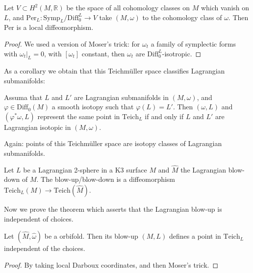 \begin{theorem}
\label{theorem-}
Let $V \subset H^{2}(M,\mathbb{R})$ be the
space of all
cohomology classes on $M$ which vanish on
$L$,
and $\text{Per}_L:
\text{Symp}_L/\text{Diff}^L_0 \to V$
take $(M,\omega)$ to the cohomology class of
$\omega$.
Then Per is a local diffeomorphism.
\end{theorem}

\begin{proof}
We used a version of Moser's trick: for
$\omega_t$ a family
of symplectic forms with $\omega_t|_{L}=0$,
with $[\omega_t]$ constant, then $\omega_t$
are $\text{Diff}_0^L$-isotropic.
\end{proof}

\noindent
As a corollary we obtain that this
Teichmüller space
classifies Lagrangian submanifolds:

\begin{corollary}
\label{lemma-techm-class-lagra-subma}
Assuma that $L$ and $L'$ are Lagrangian
submanifolds in $(M,\omega)$,
and $\varphi \in \text{Diff}_0(M)$ a smooth
isotopy such that
$\varphi(L)=L'$. Then $(\omega,L)$ and
$(\varphi^*\omega,L)$
represent the same point in $\text{Teich}_L$
if and only if
$L$ and $L'$ are Lagrangian isotopic in
$(M,\omega)$.
\end{corollary}

\noindent
Again: points of this Teichmüller space are
isotopy classes
of Lagrangian submanifolds.

\medskip\noindent
\begin{theorem}
\label{theorem-blow-down-diffeomorphism}
Let $L$ be a Lagrangian 2-sphere in a K3
surface  $M$
and $\hat{M}$ the Lagrangian blow-down of
$M$.
The blow-up/blow-down
is a diffeomorphism $\text{Teich}_L(M) \to
\text{Teich}(\hat{M})$.
\end{theorem}

\medskip\noindent
Now we prove the theorem which asserts that
the Lagrangian
blow-up is independent of choices.

\begin{theorem}
\label{theorem-lagrangian-blow-up-well-defined}
Let $(\hat{M},\hat{\omega})$ be a orbifold.
Then its blow-up
$(M,L)$ defines a point in $\text{Teich}_L$
independent of the choices.
\end{theorem}

\begin{proof}
By taking local Darboux coordinates, and then
Moser's trick.
\end{proof}

